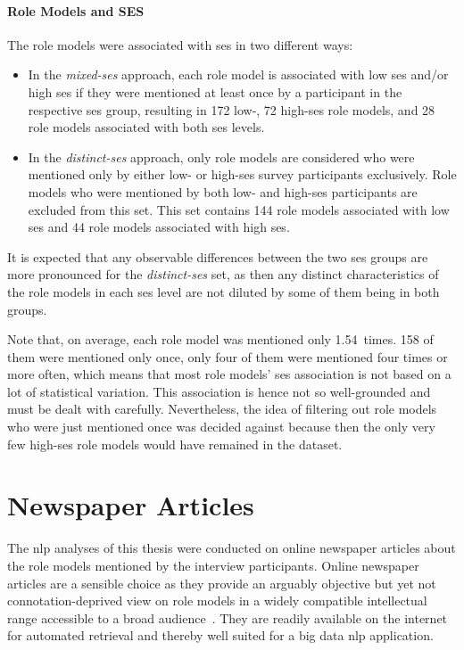 \paragraph{Role Models and SES}
The role models were associated with \gls{ses} in two different ways:
\begin{itemize}
    \item In the \textit{mixed-\gls{ses}} approach, each role model is associated with low \gls{ses} and/or high \gls{ses} if they were mentioned at least once by a participant in the respective \gls{ses} group, resulting in \SI{172}{} low-, \SI{72}{} high-\gls{ses} role models, and \SI{28}{} role models associated with both \gls{ses} levels.

    \item In the \textit{distinct-\gls{ses}} approach, only role models are considered who were mentioned only by either low- or high-\gls{ses} survey participants exclusively. Role models who were mentioned by both low- and high-\gls{ses} participants are excluded from this set. This set contains \SI{144}{} role models associated with low \gls{ses} and \SI{44}{} role models associated with high \gls{ses}.
\end{itemize}

It is expected that any observable differences between the two \gls{ses} groups are more pronounced for the \textit{distinct-\gls{ses}} set, as then any distinct characteristics of the role models in each \gls{ses} level are not diluted by some of them being in both groups.

Note that, on average, each role model was mentioned only \SI{1.54}{times}. \SI{158}{} of them were mentioned only once, only four of them were mentioned four times or more often, which means that most role models' \gls{ses} association is not based on a lot of statistical variation. This association is hence not so well-grounded and must be dealt with carefully. Nevertheless, the idea of filtering out role models who were just mentioned once was decided against because then the only very few high-\gls{ses} role models would have remained in the dataset.


\section{Newspaper Articles}
The \gls{nlp} analyses of this thesis were conducted on online newspaper articles about the role models mentioned by the interview participants. Online newspaper articles are a sensible choice as they provide an arguably objective but yet not connotation-deprived view on role models in a  widely compatible intellectual range accessible to a broad audience~\autocite{dubied_studying_2014}. They are readily available on the internet for automated retrieval and thereby well suited for a big data \gls{nlp} application.


